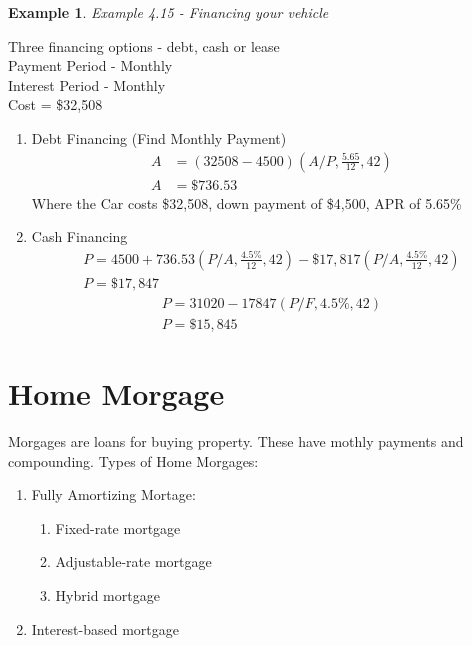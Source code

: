 \documentclass{report} %
\newtheorem{exmp}{Example}
\begin{document}
\begin{exmp}
    Example 4.15 - Financing your vehicle
\end{exmp}
\begin{center}
    Three financing options - debt, cash or lease \\
    Payment Period - Monthly \\
    Interest Period - Monthly \\
    Cost = \$32,508
\end{center}
\begin{enumerate}
    \item Debt Financing (Find Monthly Payment) 
    \begin{equation*}
        \begin{aligned}
            A &= (32508-4500)(A/P,\frac{5.65}{12},42) \\
            A &= \$736.53
        \end{aligned}
    \end{equation*}
    Where the Car costs \$32,508, down payment of \$4,500, APR of 5.65\%
    \item Cash Financing
    \begin{equation*}
        \begin{aligned}
            P = 4500 + 736.53(P/A,\frac{4.5\%}{12},42) - \$17,817(P/A,\frac{4.5\%}{12},42)\\
            P = \$17,847
        \end{aligned}
    \end{equation*}
    \begin{equation*}
        \begin{aligned}
            P = 31020 - 17847(P/F,4.5\%,42) \\
            P = \$15,845
        \end{aligned}
    \end{equation*}
\end{enumerate}

\section*{Home Morgage}
Morgages are loans for buying property. These have mothly payments and compounding.
Types of Home Morgages:
\begin{enumerate}
    \item Fully Amortizing Mortage:
    \begin{enumerate}
        \item Fixed-rate mortgage
        \item Adjustable-rate mortgage
        \item Hybrid mortgage
    \end{enumerate}
    \item Interest-based mortgage
\end{enumerate}
\end{document}
